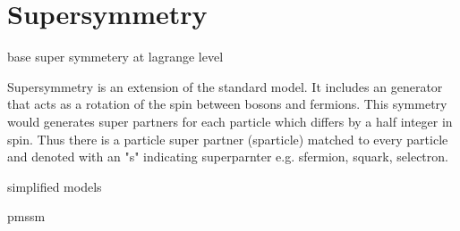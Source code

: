 \section{Supersymmetry}

base super symmetery at lagrange level

Supersymmetry is an extension of the standard model. It includes an generator that acts as a rotation of the spin between bosons and fermions. This symmetry would generates super partners for each particle which differs by a half integer in spin. Thus there is a particle super partner (sparticle) matched to every particle and denoted with an "s" indicating superparnter e.g. sfermion, squark, selectron. 


simplified models

pmssm
